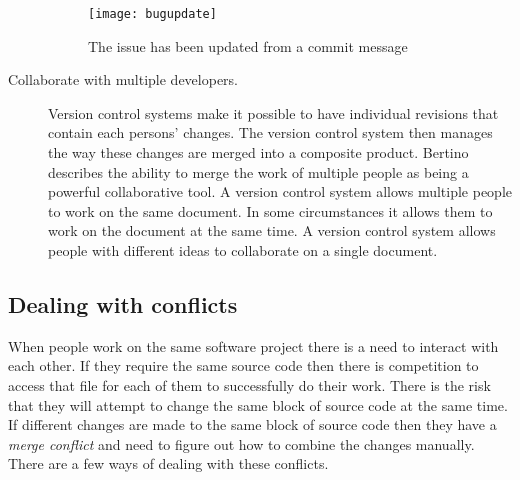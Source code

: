 \begin{description}
  \begin{figure}[!t]
   \begin{center}
    \texttt{[image: bugupdate]}
   \end{center}
   \caption{The issue has been updated from a commit message}
   \label{fig:bgBugUpdate}
  \end{figure}

  \item [Collaborate with multiple developers.]
  Version control systems make it possible to have individual revisions that contain each persons' changes. The version control system then manages the way these changes are merged into a composite product. Bertino \cite{Bertino2012} describes the ability to merge the work of multiple people as being a powerful collaborative tool. A version control system allows multiple people to work on the same document. In some circumstances it allows them to work on the document at the same time.  A version control system allows people with different ideas to collaborate on a single document.


\end{description}



\subsection{Dealing with conflicts}
When people work on the same software project there is a need to interact with each other.
If they require the same source code then there is competition to access that file for each of them to successfully do their work.
There is the risk that they will attempt to change the same block of source code at the same time.
If different changes are made to the same block of source code then they have a \emph{merge conflict} and need to figure out how to combine the changes manually.
There are a few ways of dealing with these conflicts.

